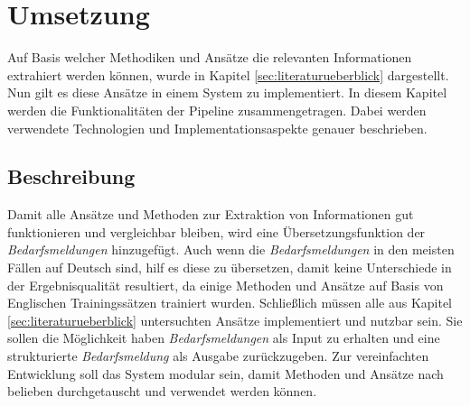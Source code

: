 \chapter{Umsetzung}
\label{chap:implementierung}
Auf Basis welcher Methodiken und Ansätze die relevanten Informationen extrahiert werden können, wurde in Kapitel \ref{sec:literaturueberblick} dargestellt. Nun gilt es diese Ansätze in einem System zu implementiert. In diesem Kapitel werden die Funktionalitäten der Pipeline zusammengetragen. Dabei werden verwendete Technologien und Implementationsaspekte genauer beschrieben.
\section{Beschreibung}
Damit alle Ansätze und Methoden zur Extraktion von Informationen gut funktionieren und vergleichbar bleiben, wird eine Übersetzungsfunktion der \emph{Bedarfsmeldungen} hinzugefügt. Auch wenn die \emph{Bedarfsmeldungen} in den meisten Fällen auf Deutsch sind, hilf es diese zu übersetzen, damit keine Unterschiede in der Ergebnisqualität resultiert, da einige Methoden und Ansätze auf Basis von Englischen Trainingssätzen trainiert wurden. Schließlich müssen alle aus Kapitel \ref{sec:literaturueberblick} untersuchten Ansätze implementiert und nutzbar sein. Sie sollen die Möglichkeit haben \emph{Bedarfsmeldungen} als Input zu erhalten und eine strukturierte \emph{Bedarfsmeldung} als Ausgabe zurückzugeben. Zur vereinfachten Entwicklung soll das System modular sein, damit Methoden und Ansätze nach belieben durchgetauscht und verwendet werden können.\\
